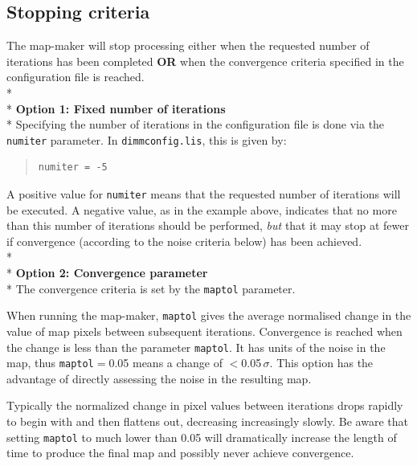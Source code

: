 \documentclass[twoside,11pt]{article}
\newcommand{\xlabel}[1]{}
\renewcommand{\_}{\texttt{\symbol{95}}}
\newenvironment{myquote}{\begin{quote}\begin{small}}{\end{small}\end{quote}}
\begin{document}
\subsection{\xlabel{convergence}Stopping criteria}
\label{sec:converge}

The map-maker will stop processing either when the requested number of
iterations has been completed \textbf{OR} when the convergence
criteria specified in the configuration file is reached.
\\*\\*
\textbf{Option 1: Fixed number of iterations}\\*
Specifying the number of iterations in the configuration file is done via
the \texttt{numiter} parameter. In \texttt{dimmconfig.lis}, this is given
by:
\vspace{-0.1cm}
\begin{myquote}
\begin{verbatim}
numiter = -5
\end{verbatim}
\end{myquote}
\vspace{-0.1cm}
A positive value for \texttt{numiter} means that the requested number
of iterations will be executed. A negative value, as in the example
above, indicates that no more than this number of iterations should be
performed, \emph{but} that it may stop at fewer if convergence
(according to the noise criteria below) has been achieved.
\\*\\*
\textbf{Option 2: Convergence parameter}\\*
The convergence criteria is set by the \texttt{maptol} parameter.

When running the map-maker, \texttt{maptol} gives the average
normalised change in the value of map pixels
between subsequent iterations. Convergence is reached when the change
is less than the parameter \texttt{maptol}. It has units of the noise
in the map, thus \texttt{maptol}$=$0.05 means a change of
$<$0.05\,$\sigma$. This option has the advantage of directly assessing
the noise in the resulting map.

Typically the normalized change in pixel values between iterations
drops rapidly to begin with and then flattens out, decreasing
increasingly slowly.  Be aware that setting \texttt{maptol} to much
lower than 0.05 will dramatically increase the length of time to
produce the final map and possibly never achieve convergence.
\vspace{2mm}
\end{document}
